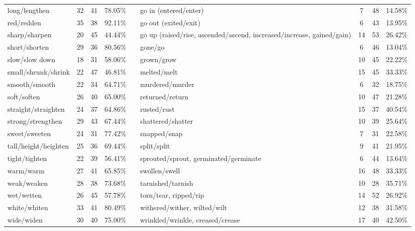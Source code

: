 \begin{tabular}{p{3cm}ccccp{3cm}ccc}
long/lengthen & 32 & 41 & 78.05\% & & go in (entered/enter) & 7 & 48 & 14.58\% \\
red/redden & 35 & 38 & 92.11\% & & go out (exited/exit) & 6 & 43 & 13.95\% \\
sharp/sharpen & 20 & 45 & 44.44\% & & go up (raised/rise, ascended/ascend, increased/increase, gained/gain) & 14 & 53 & 26.42\% \\
short/shorten & 29 & 36 & 80.56\% & & gone/go & 6 & 46 & 13.04\% \\
slow/slow down & 18 & 31 & 58.06\% & & grown/grow & 10 & 45 & 22.22\% \\
small/shrunk/shrink & 22 & 47 & 46.81\% & & melted/melt & 15 & 45 & 33.33\% \\
smooth/smooth & 22 & 34 & 64.71\% & & murdered/murder & 6 & 32 & 18.75\% \\
soft/soften & 26 & 40 & 65.00\% & & returned/return & 10 & 47 & 21.28\% \\
straight/straighten & 24 & 37 & 64.86\% & & rusted/rust & 15 & 37 & 40.54\% \\
strong/strengthen & 29 & 43 & 67.44\% & & shattered/shatter & 10 & 39 & 25.64\% \\
sweet/sweeten & 24 & 31 & 77.42\% & & snapped/snap & 7 & 31 & 22.58\% \\
tall/height/heighten & 25 & 36 & 69.44\% & & split/split & 9 & 41 & 21.95\% \\
tight/tighten & 22 & 39 & 56.41\% & & sprouted/sprout, germinated/germinate & 6 & 44 & 13.64\% \\
warm/warm & 27 & 41 & 65.85\% & & swollen/swell & 16 & 48 & 33.33\% \\
weak/weaken & 28 & 38 & 73.68\% & & tarnished/tarnish & 10 & 28 & 35.71\% \\
wet/wetten & 26 & 45 & 57.78\% & & torn/tear, ripped/rip & 14 & 52 & 26.92\% \\
white/whiten & 33 & 41 & 80.49\% & & withered/wither, wilted/wilt & 12 & 38 & 31.58\% \\
wide/widen & 30 & 40 & 75.00\% & & wrinkled/wrinkle, creased/crease & 17 & 40 & 42.50\%
\end{tabular}